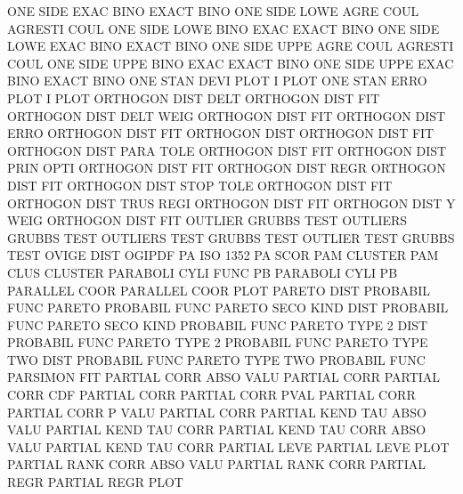 ONE      SIDE EXAC BINO                 EXACT    BINO
ONE      SIDE LOWE AGRE COUL            AGRESTI  COUL
ONE      SIDE LOWE BINO EXAC            EXACT    BINO
ONE      SIDE LOWE EXAC BINO            EXACT    BINO
ONE      SIDE UPPE AGRE COUL            AGRESTI  COUL
ONE      SIDE UPPE BINO EXAC            EXACT    BINO
ONE      SIDE UPPE EXAC BINO            EXACT    BINO
ONE      STAN DEVI PLOT                 I        PLOT
ONE      STAN ERRO PLOT                 I        PLOT
ORTHOGON DIST DELT                      ORTHOGON DIST FIT
ORTHOGON DIST DELT WEIG                 ORTHOGON DIST FIT
ORTHOGON DIST ERRO                      ORTHOGON DIST FIT
ORTHOGON DIST                           ORTHOGON DIST FIT
ORTHOGON DIST PARA TOLE                 ORTHOGON DIST FIT
ORTHOGON DIST PRIN OPTI                 ORTHOGON DIST FIT
ORTHOGON DIST REGR                      ORTHOGON DIST FIT
ORTHOGON DIST STOP TOLE                 ORTHOGON DIST FIT
ORTHOGON DIST TRUS REGI                 ORTHOGON DIST FIT
ORTHOGON DIST Y    WEIG                 ORTHOGON DIST FIT
OUTLIER                                 GRUBBS   TEST
OUTLIERS                                GRUBBS   TEST
OUTLIERS TEST                           GRUBBS   TEST
OUTLIER  TEST                           GRUBBS   TEST
OVIGE    DIST                           OGIPDF
PA                                      ISO      1352 PA   SCOR
PAM                                     CLUSTER
PAM      CLUS                           CLUSTER
PARABOLI CYLI FUNC                      PB
PARABOLI CYLI                           PB
PARALLEL COOR                           PARALLEL COOR PLOT
PARETO   DIST                           PROBABIL FUNC
PARETO                                  PROBABIL FUNC
PARETO   SECO KIND DIST                 PROBABIL FUNC
PARETO   SECO KIND                      PROBABIL FUNC
PARETO   TYPE 2    DIST                 PROBABIL FUNC
PARETO   TYPE 2                         PROBABIL FUNC
PARETO   TYPE TWO  DIST                 PROBABIL FUNC
PARETO   TYPE TWO                       PROBABIL FUNC
PARSIMON                                FIT
PARTIAL  CORR ABSO VALU                 PARTIAL  CORR
PARTIAL  CORR CDF                       PARTIAL  CORR
PARTIAL  CORR PVAL                      PARTIAL  CORR
PARTIAL  CORR P    VALU                 PARTIAL  CORR
PARTIAL  KEND TAU  ABSO VALU            PARTIAL  KEND TAU  CORR
PARTIAL  KEND TAU  CORR ABSO VALU       PARTIAL  KEND TAU  CORR
PARTIAL  LEVE                           PARTIAL  LEVE PLOT
PARTIAL  RANK CORR ABSO VALU            PARTIAL  RANK CORR
PARTIAL  REGR                           PARTIAL  REGR PLOT
